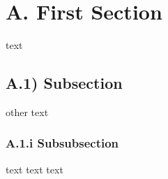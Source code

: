 \section{A. First Section}\label{first-section}

text

\subsection{A.1) Subsection}\label{subsection}

other text

\subsubsection{A.1.i Subsubsection}\label{subsubsection}

text text text
